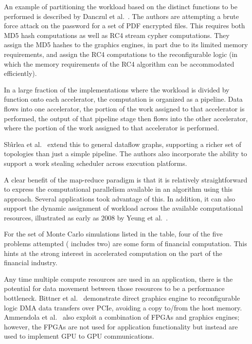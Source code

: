 An example of partitioning the workload based on the distinct functions to be
performed is described by Danczul et al.~\cite{dfg+13}. The authors are
attempting a brute force attack on the password for a set of PDF encrypted
files.  This requires both MD5 hash computations as well as RC4 stream cypher 
computations.  They assign the MD5 hashes to the graphics engines, in part
due to its limited memory requirements, and assign the RC4 computations to the
reconfigurable logic (in which the memory requirements of the RC4 algorithm
can be accommodated efficiently).

In a large fraction of the implementations where the workload is
divided by function onto each accelerator, the computation is 
organized as a pipeline.  Data flows into one accelerator, the portion
of the work assigned to that accelerator is performed, the output
of that pipeline stage then flows into the other accelerator, where
the portion of the work assigned to that accelerator is performed.

Sb\^{\i}rlea et al.~\cite{szb+12} extend this to general dataflow graphs,
supporting a richer set of topologies than just a simple pipeline.  The authors
also incorporate the ability to support a work stealing scheduler across
execution platforms.

A clear benefit of the map-reduce paradigm is that it is relatively
straightforward to express the computational parallelism available in
an algorithm using this approach.  Several applications took advantage
of this.  In addition, it can also support the dynamic assignment of
workload across the available computational resources, illustrated as
early as 2008 by Yeung et al.~\cite{ytt+08}.

For the set of Monte Carlo simulations listed in the table,
four of the five problems attempted
(\cite{tttl10} includes two) are some form of financial computation.
This hints at the strong interest in accelerated computation on the
part of the financial industry.

Any time multiple compute resources are used in an application, there is
the potential for data movement between those resources to be a performance
bottleneck.  Bittner et al.~\cite{brf14} demonstrate direct graphics engine
to reconfigurable logic DMA data transfers over PCIe, avoiding a copy
to/from the host memory.
Ammendola et al.~\cite{abb+13} also exploit a combination of FPGAs and
graphics engines; however, the FPGAs are not used for application functionality
but instead are used to implement GPU to GPU communications.

